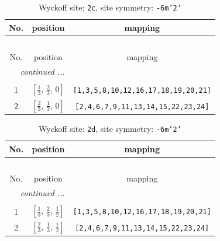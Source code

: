 \documentclass[fleqn,8pt]{jsarticle}
\begin{document}
\begin{longtable}{ccc}
\caption{Wyckoff site: {\tt 2c}, site symmetry: {\tt -6m'2'}}
 \\
 \hline \hline
No. & position & mapping \\ \hline \endfirsthead

\multicolumn{2}{l}{\tablename\ \thetable{}} \\
 \hline \hline
No. & position & mapping \\ \hline \endhead

 \hline \hline
\multicolumn{2}{r}{\footnotesize\it continued ...} \\ \endfoot

 \hline \hline
\multicolumn{2}{r}{} \\ \endlastfoot

1 & $\left[ \frac{1}{3},\, \frac{2}{3},\, 0 \right]$ & {\tt [1,3,5,8,10,12,16,17,18,19,20,21]} \\ \hline
2 & $\left[ \frac{2}{3},\, \frac{1}{3},\, 0 \right]$ & {\tt [2,4,6,7,9,11,13,14,15,22,23,24]} \\
\end{longtable}
\renewcommand{\arraystretch}{1.2}
\begin{longtable}{ccc}
\caption{Wyckoff site: {\tt 2d}, site symmetry: {\tt -6m'2'}}
 \\
 \hline \hline
No. & position & mapping \\ \hline \endfirsthead

\multicolumn{2}{l}{\tablename\ \thetable{}} \\
 \hline \hline
No. & position & mapping \\ \hline \endhead

 \hline \hline
\multicolumn{2}{r}{\footnotesize\it continued ...} \\ \endfoot

 \hline \hline
\multicolumn{2}{r}{} \\ \endlastfoot

1 & $\left[ \frac{1}{3},\, \frac{2}{3},\, \frac{1}{2} \right]$ & {\tt [1,3,5,8,10,12,16,17,18,19,20,21]} \\ \hline
2 & $\left[ \frac{2}{3},\, \frac{1}{3},\, \frac{1}{2} \right]$ & {\tt [2,4,6,7,9,11,13,14,15,22,23,24]} \\
\end{longtable}
\renewcommand{\arraystretch}{1.2}
\end{document}
